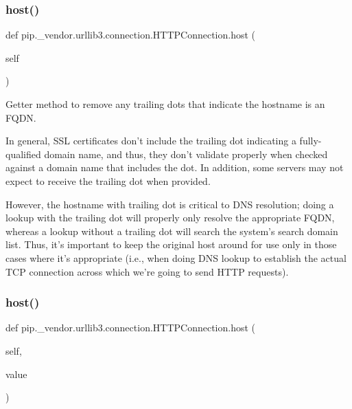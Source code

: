 \subsubsection{\texorpdfstring{host()}{host()}\hspace{0.1cm}{\footnotesize\ttfamily [1/2]}}
{\footnotesize\ttfamily def pip.\+\_\+vendor.\+urllib3.\+connection.\+H\+T\+T\+P\+Connection.\+host (\begin{DoxyParamCaption}\item[{}]{self }\end{DoxyParamCaption})}

\begin{DoxyVerb}Getter method to remove any trailing dots that indicate the hostname is an FQDN.

In general, SSL certificates don't include the trailing dot indicating a
fully-qualified domain name, and thus, they don't validate properly when
checked against a domain name that includes the dot. In addition, some
servers may not expect to receive the trailing dot when provided.

However, the hostname with trailing dot is critical to DNS resolution; doing a
lookup with the trailing dot will properly only resolve the appropriate FQDN,
whereas a lookup without a trailing dot will search the system's search domain
list. Thus, it's important to keep the original host around for use only in
those cases where it's appropriate (i.e., when doing DNS lookup to establish the
actual TCP connection across which we're going to send HTTP requests).
\end{DoxyVerb}
 \mbox{\label{classpip_1_1__vendor_1_1urllib3_1_1connection_1_1HTTPConnection_a68587ff6bb26a75d8bea4a96dd1237f3}} 
\subsubsection{\texorpdfstring{host()}{host()}\hspace{0.1cm}{\footnotesize\ttfamily [2/2]}}
{\footnotesize\ttfamily def pip.\+\_\+vendor.\+urllib3.\+connection.\+H\+T\+T\+P\+Connection.\+host (\begin{DoxyParamCaption}\item[{}]{self,  }\item[{}]{value }\end{DoxyParamCaption})}

